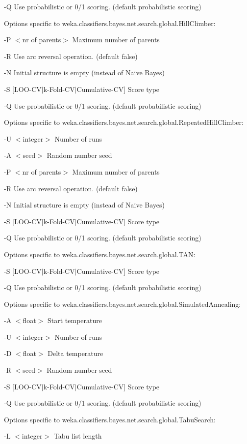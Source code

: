 \documentclass{article}
\begin{document}
-Q
	Use probabilistic or 0/1 scoring.
	(default probabilistic scoring)

\noindent 
Options specific to weka.classifiers.bayes.net.search.global.HillClimber:

-P $<$nr of parents$>$
	Maximum number of parents

-R
	Use arc reversal operation.
	(default false)

-N
	Initial structure is empty (instead of Naive Bayes)

-S [LOO-CV$|$k-Fold-CV$|$Cumulative-CV]
	Score type 

-Q
	Use probabilistic or 0/1 scoring.
	(default probabilistic scoring)

\noindent 
Options specific to weka.classifiers.bayes.net.search.global.RepeatedHillClimber:

-U $<$integer$>$
	Number of runs

-A $<$seed$>$
	Random number seed

-P $<$nr of parents$>$
	Maximum number of parents

-R
	Use arc reversal operation.
	(default false)

-N
	Initial structure is empty (instead of Naive Bayes)

-S [LOO-CV$|$k-Fold-CV$|$Cumulative-CV]
	Score type 

-Q
	Use probabilistic or 0/1 scoring.
	(default probabilistic scoring)

\noindent 
Options specific to weka.classifiers.bayes.net.search.global.TAN:

-S [LOO-CV$|$k-Fold-CV$|$Cumulative-CV]
	Score type 

-Q
	Use probabilistic or 0/1 scoring.
	(default probabilistic scoring)

\noindent 
Options specific to weka.classifiers.bayes.net.search.global.SimulatedAnnealing:

-A $<$float$>$
	Start temperature

-U $<$integer$>$
	Number of runs

-D $<$float$>$
	Delta temperature

-R $<$seed$>$
	Random number seed

-S [LOO-CV$|$k-Fold-CV$|$Cumulative-CV]
	Score type 

-Q
	Use probabilistic or 0/1 scoring.
	(default probabilistic scoring)

\noindent 
Options specific to weka.classifiers.bayes.net.search.global.TabuSearch:

-L $<$integer$>$
	Tabu list length
\end{document}
